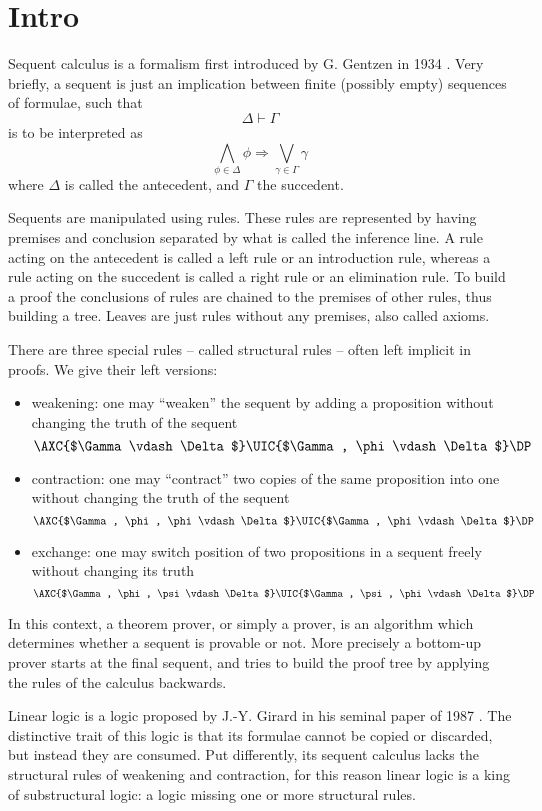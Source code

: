 \chapter{Intro}\label{chapter:intro}
Sequent calculus is a formalism first introduced by G. Gentzen in 1934 \cite{Gentzen1935I, Gentzen1935II}.
Very briefly, a sequent is just an implication between finite (possibly empty) sequences of formulae, such that
$$ \Delta \vdash \Gamma $$ 
is to be interpreted as
$$ \bigwedge_{\phi \in \Delta} \phi \Rightarrow \bigvee_{\gamma \in \Gamma} \gamma $$
where $\Delta$ is called the antecedent, and $\Gamma$ the succedent.

Sequents are manipulated using rules.
These rules are represented by having premises and conclusion separated by what is called the inference line.
A rule acting on the antecedent is called a left rule or an introduction rule, whereas a rule acting on the succedent is called a right rule or an elimination rule.
To build a proof the conclusions of rules are chained to the premises of other rules, thus building a tree.
Leaves are just rules without any premises, also called axioms.

There are three special rules -- called structural rules -- often left implicit in proofs.
We give their left versions:
\begin{itemize}
	\item weakening: one may ``weaken'' the sequent by adding a proposition without changing the truth of the sequent
		$$
		\AXC{$\Gamma \vdash \Delta$}
		\UIC{$\Gamma, \phi \vdash \Delta$}
		\DP
		$$
	\item contraction: one may ``contract'' two copies of the same proposition into one without changing the truth of the sequent
		$$
		\AXC{$\Gamma, \phi, \phi \vdash \Delta$}
		\UIC{$\Gamma, \phi \vdash \Delta$}
		\DP
		$$
	\item exchange: one may switch position of two propositions in a sequent freely without changing its truth
		$$
		\AXC{$\Gamma, \phi, \psi \vdash \Delta$}
		\UIC{$\Gamma, \psi, \phi \vdash \Delta$}
		\DP
		$$
\end{itemize}
In this context, a theorem prover, or simply a prover, is an algorithm which determines whether a sequent is provable or not.
More precisely a bottom-up prover starts at the final sequent, and tries to build the proof tree by applying the rules of the calculus backwards.

Linear logic is a logic proposed by J.-Y. Girard in his seminal paper of 1987 \cite{LinearLogic}.
The distinctive trait of this logic is that its formulae cannot be copied or discarded, but instead they are consumed.
Put differently, its sequent calculus lacks the structural rules of weakening and contraction, for this reason linear logic is a king of substructural logic: a logic missing one or more structural rules.

